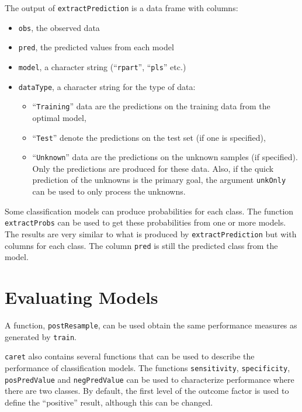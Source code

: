 \documentclass[12pt]{article}
\begin{document}
The output of \texttt{extractPrediction} is a data frame with columns:
   \begin{itemize}   
      \item \texttt{obs}, the observed data
      \item \texttt{pred}, the predicted values from each model
      \item \texttt{model}, a character string (``\texttt{rpart}'', ``\texttt{pls}'' etc.)
      \item \texttt{dataType}, a character string for the type of data:
      \begin{itemize}
         \item ``\texttt{Training}'' data are the predictions on the training data from
            the optimal model,
         \item ``\texttt{Test}'' denote the predictions on the test set (if one is specified),
         \item ``\texttt{Unknown}'' data are the predictions on the unknown samples (if specified). 
         Only the predictions are produced for these data. Also, if the quick prediction of the unknowns
         is the primary goal, the argument \texttt{unkOnly} can be used to only process the unknowns.
      \end{itemize}
   \end{itemize}      

Some classification models can produce probabilities for each class. The function \texttt{extractProbs} can be used to get these probabilities from one or more models. The results are very similar to what is produced by \texttt{extractPrediction} but with columns for each class. The column \texttt{pred} is still the predicted class from the model. 


\section{Evaluating Models}

A function, \texttt{postResample}, can be used obtain the same performance measures as generated by \texttt{train}. 

\texttt{caret} also contains several functions that can be used to describe the performance of classification models. The functions \texttt{sensitivity}, \texttt{specificity}, \texttt{posPredValue} and \texttt{negPredValue} can be used to characterize performance where there are two classes. By default, the first level of the outcome factor is used to define the ``positive'' result, although this can be changed. 
\end{document}
